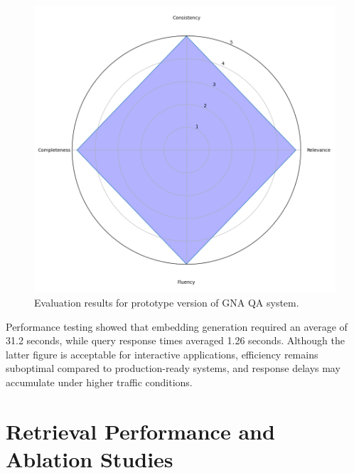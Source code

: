 \begin{spacing}{1.5}
\begin{figure}[H]
  \centering
  \includegraphics[width=\textwidth]{images/radar.png} 
  \caption{Evaluation results for prototype version of GNA QA system.}
  \label{fig:proto_results}
\end{figure}

Performance testing showed that embedding generation required an average of 31.2 seconds, while query response times averaged 1.26 seconds. Although the latter figure is acceptable for interactive applications, efficiency remains suboptimal compared to production-ready systems, and response delays may accumulate under higher traffic conditions.

\section{Retrieval Performance and Ablation Studies}\label{sec:retrieval_ablation}



\end{spacing}
